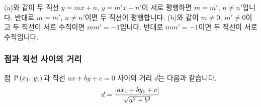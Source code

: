 \begin{figure}[h]
  \centering
  \qquad
\end{figure}

(a)와 같이 두 직선 $y=mx+n$, $y=m'x+n'$이 서로 평행하면 $m=m'$, $n \ne n'$입니다. 반대로 $m=m'$, $n \ne n'$이면 두 직선이 평행합니다. (b)와 같이 $m \ne 0$, $m' \ne 0$이고 두 직선이 서로 수직이면 $mm' = -1$입니다. 반대로 $mm'=-1$이면 두 직선이 서로 수직입니다.

\subsubsection{점과 직선 사이의 거리}
점 $\xy[P]{x_1}{y_1}$과 직선 $ax+by+c=0$ 사이의 거리 $d$는 다음과 같습니다.
\begin{align*} d = \dfrac{\abs{ax_1+by_1+c}}{\sqrt{a^2+b^2}} \end{align*}
\clearpage
